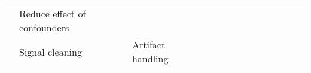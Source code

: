 \begin{tabular}{p{1.5cm}p{1.5cm}p{1.5cm}p{1.5cm}p{0.6cm}p{0.6cm}p{0.6cm}p{0.6cm}p{0.6cm}p{0.6cm}p{0.6cm}p{0.6cm}p{0.6cm}p{0.6cm}}
                                & Reduce effect of confounders &   &   &                                                             &                                                                                                                             &                                                                        &                                      &                                                            &                      &                       &                                 &                         &                                                        \cite{Wu2018} \\
                                & Signal cleaning & Artifact handling &   &                                  \cite{Yang2018, Yang2016a} &                                                                                                            \cite{Wang2018a} &                                                                        &                                      &                                     \cite{drouin2016using} &                      &                       &                                 &                         &                                                   \cite{Pardede2015} \\
\bottomrule
\end{tabular}
